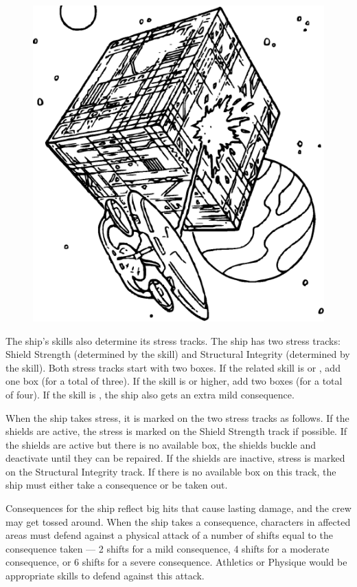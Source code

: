 \documentclass[12pt,titlepage,openany]{book}
\begin{document}
\begin{figure}
    \centering
    \includegraphics[width=0.9\linewidth]{img/Borg.eps}\\
\end{figure}

The ship's skills also determine its stress tracks. The ship has two stress
tracks: Shield Strength (determined by the  skill) and
Structural Integrity (determined by the  skill). Both stress
tracks start with two boxes. If the related skill is  or
, add one box (for a total of three). If the skill is 
or higher, add two boxes (for a total of four). If the skill is ,
the ship also gets an extra mild consequence.

When the ship takes stress, it is marked on the two stress tracks as follows.
If the shields are active, the stress is marked on the Shield Strength track if
possible. If the shields are active but there is no available box, the shields
buckle and deactivate until they can be repaired. If the shields are inactive,
stress is marked on the Structural Integrity track. If there is no available
box on this track, the ship must either take a consequence or be taken out.

Consequences for the ship reflect big hits that cause lasting damage, and the
crew may get tossed around. When the ship takes a consequence, characters in
affected areas must defend against a physical attack of a number of shifts
equal to the consequence taken --- 2 shifts for a mild consequence, 4 shifts
for a moderate consequence, or 6 shifts for a severe consequence. Athletics or
Physique would be appropriate skills to defend against this attack.
\end{document}
